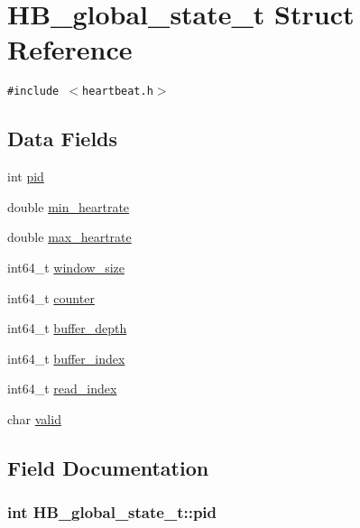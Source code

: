 \hypertarget{structHB__global__state__t}{
\section{HB\_\-global\_\-state\_\-t Struct Reference}
\label{structHB__global__state__t}
}
{\tt \#include $<$heartbeat.h$>$}

\subsection*{Data Fields}
\begin{CompactItemize}
\item 
int \hyperlink{structHB__global__state__t_0d1d3c8e742b911354ba3ee6137c18aa}{pid}
\item 
double \hyperlink{structHB__global__state__t_1e531715cdb0158d4dbed85ec03a93cd}{min\_\-heartrate}
\item 
double \hyperlink{structHB__global__state__t_51449f2bbc0942f2338f33344db60a0a}{max\_\-heartrate}
\item 
int64\_\-t \hyperlink{structHB__global__state__t_7b0a184f5935470b02d8bc77d85213d7}{window\_\-size}
\item 
int64\_\-t \hyperlink{structHB__global__state__t_2b7b3645f2a82634109846fede82cdbc}{counter}
\item 
int64\_\-t \hyperlink{structHB__global__state__t_a9ca882a3705b1966c29b583f8d29038}{buffer\_\-depth}
\item 
int64\_\-t \hyperlink{structHB__global__state__t_0169d181b2b325ca797d36804e7d36f7}{buffer\_\-index}
\item 
int64\_\-t \hyperlink{structHB__global__state__t_0e0c007414f8172e548a0a47fd2830ac}{read\_\-index}
\item 
char \hyperlink{structHB__global__state__t_7ce5c2239f64dda6665d3a60c9262dc6}{valid}
\end{CompactItemize}


\subsection{Field Documentation}
\hypertarget{structHB__global__state__t_0d1d3c8e742b911354ba3ee6137c18aa}{
\subsubsection[pid]{\setlength{\rightskip}{0pt plus 5cm}int {\bf HB\_\-global\_\-state\_\-t::pid}}}
\label{structHB__global__state__t_0d1d3c8e742b911354ba3ee6137c18aa}


